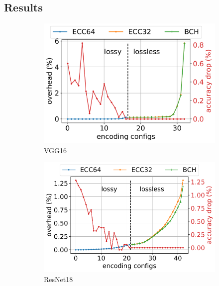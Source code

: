 \documentclass{article}
\begin{document}
\subsection{Results}

\begin{figure}
	\centering
	\begin{subfigure}{.3\textwidth}
		\includegraphics[width=\textwidth]{NeuRIPS2019/images/overhead/vgg16_int8_overhead.pdf}
		\caption{VGG16}
	\end{subfigure}
	\begin{subfigure}{.3\textwidth}
		\includegraphics[width=\textwidth]{NeuRIPS2019/images/overhead/resnet18_int8_overhead.pdf}
		\caption{ResNet18}
	\end{subfigure}
	\begin{subfigure}{.3\textwidth}

\end{subfigure}
\end{figure}
\end{document}
